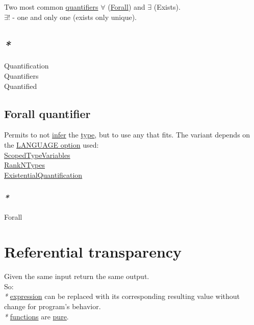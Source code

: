 \documentclass[a4paper,14pt,oneside]{book}
\begin{document}
Two most common \hyperref[org4830110]{quantifiers} \(\forall\) (\hyperref[org746410f]{Forall}) and \(\exists\) (Exists).\\
\(\exists !\) - one and only one (exists only unique).\\

\section{\emph{*}}
\label{sec:org9e816bd}

\label{org6d3932b}Quantification\\
\label{org4830110}Quantifiers\\
\label{orge0a1347}Quantified\\

\section{\label{orgcd7e453}Forall quantifier}
\label{sec:orgdabc236}
Permits to not \hyperref[org4ee69cd]{infer} the \hyperref[orgd6db20c]{type}, but to use any that fits. The variant depends on the \hyperref[orgaa6df30]{LANGUAGE option} used:\\
\hyperref[org72c1aec]{ScopedTypeVariables}\\
\hyperref[org5dc54b4]{RankNTypes}\\
\hyperref[org006cafa]{ExistentialQuantification}\\

\subsection{\emph{*}}
\label{sec:org236a34e}

\label{org746410f}Forall\\

\chapter{\label{org45599a6}Referential transparency}
\label{sec:org2e440a9}
Given the same input return the same output.\\
So:\\
\emph{*} \hyperref[org6aa6989]{expression} can be replaced with its corresponding resulting value without change for program's behavior.\\
\emph{*} \hyperref[org0bd6046]{functions} are \hyperref[orgbb61cf1]{pure}.\\
\end{document}
